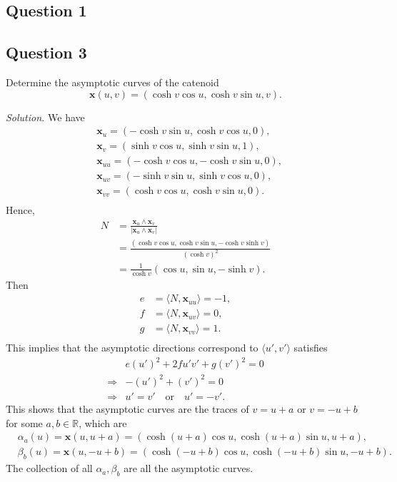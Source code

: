 \documentclass[12pt]{article}
\begin{document}
\subsection*{Question 1}

\subsection*{Question 3}
Determine the asymptotic curves of the catenoid
\begin{equation*}
    \mathbf{x}(u,v)= (\cosh{v}\cos{u},\cosh{v}\sin{u},v).
\end{equation*}

\textit{Solution.} We have \begin{align*}
    &\mathbf{x}_u= (-\cosh{v}\sin{u},\cosh{v}\cos{u},0),\\
    &\mathbf{x}_v= (\sinh{v}\cos{u},\sinh{v}\sin{u},1),\\
    &\mathbf{x}_{uu}= (-\cosh{v}\cos{u},-\cosh{v}\sin{u},0),\\
    &\mathbf{x}_{uv}= (-\sinh{v}\sin{u},\sinh{v}\cos{u},0),\\
    &\mathbf{x}_{vv}= (\cosh{v}\cos{u},\cosh{v}\sin{u},0).\\
\end{align*}
Hence, \begin{align*}
    N &= \frac{\mathbf{x}_u\wedge \mathbf{x}_v}{|\mathbf{x}_u\wedge \mathbf{x}_v|}\\
    &=\frac{(\cosh{v}\cos{u},\cosh{v}\sin{u},-\cosh{v}\sinh{v})}{(\cosh{v})^2}\\
    &=\frac{1}{\cosh{v}}(\cos{u},\sin{u},-\sinh{v}).
\end{align*}
Then\begin{align*}
    e &= \langle N,\mathbf{x}_{uu}\rangle = -1,\\
    f &= \langle N,\mathbf{x}_{uv}\rangle = 0,\\
    g &= \langle N,\mathbf{x}_{vv}\rangle = 1.\\
\end{align*}
This implies that the asymptotic directions correspond to $\langle u',v'\rangle$ satisfies \begin{align*}
    &e(u')^2 + 2fu'v' + g(v')^2 = 0\\
    \Rightarrow &-(u')^2 + (v')^2 = 0\\
    \Rightarrow & u'=v' \quad\text{or}\quad u'=-v'.
\end{align*}
This shows that the asymptotic curves are the traces of $v=u+a$ or $v=-u+b$ for some $a,b\in\mathbb{R}$, which are \begin{align*}
    &\alpha_a(u) = \mathbf{x}(u,u+a) = (\cosh{(u+a)}\cos{u},\cosh{(u+a)}\sin{u},u+a),\\
    &\beta_b(u) = \mathbf{x}(u,-u+b) = (\cosh{(-u+b)}\cos{u},\cosh{(-u+b)}\sin{u},-u+b).
\end{align*}
The collection of all $\alpha_a,\beta_b$ are all the asymptotic curves.
\end{document}
